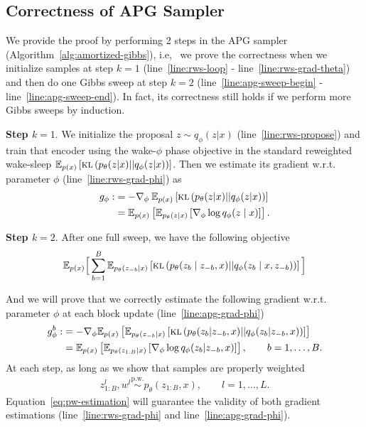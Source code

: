 \documentclass{article}
\theoremstyle{definition}
\newcommand{\given}{\lvert}
\newcommand{\pw}{\overset{\text{p.w.}}{\sim}
}
\begin{document}
\subsection{Correctness of APG Sampler}
We provide the proof by performing 2 steps in the APG sampler (Algorithm~\ref{alg:amortized-gibbs}), i.e,~ we prove the correctness when we initialize samples at step $k=1$ (line~\ref{line:rws-loop} - line~\ref{line:rws-grad-theta}) and then do one Gibbs sweep at step $k=2$ (line~\ref{line:apg-sweep-begin} - line~\ref{line:apg-sweep-end}). In fact, its correctness still holds if we perform more Gibbs sweeps by induction.

\textbf{Step $k=1$}. We initialize the proposal $z\sim q_\phi(z \given x)$ (line~\ref{line:rws-propose}) and train that encoder using the wake-$\phi$ phase objective in the standard reweighted wake-sleep\cite{le2019revisiting}
$\E_{p(x)}\left[\textsc{kl}\left(p_\theta(z \given x) || q_\phi(z \given x)\right)\right]$. 
Then we estimate its gradient w.r.t. parameter $\phi$ (line~\ref{line:rws-grad-phi}) as
\begin{align}
    \label{eq:g-rws-phi}
    g_\phi :&= - \nabla_\phi \: \E_{p(x)}\left[\textsc{kl}\left(p_\theta(z \given x) || q_\phi(z \given x)\right)\right] \\
    &
    =
    \E_{p(x)}\left[
    \E_{p_\theta(z \given x)}\left[\nabla_\phi \log q_\phi(z \mid x)\right]
    \right]
    . 
\end{align}

\textbf{Step $k=2$}. After one full sweep, we have the following objective
\begin{align*}
    \mathbb{E}_{p(x)}\Big[
    \sum_{b = 1}^B\mathbb{E}_{p_\theta(z_{-b} \mid x)}\left[\textsc{kl}\left(p_\theta(z_b \mid z_{-b}, x) || q_\phi(z_b \mid x, z_{-b})\right)\right]\Big] 
\end{align*}

And we will prove that we correctly estimate the following gradient w.r.t. parameter $\phi$ at each block update (line~\ref{line:apg-grad-phi}) 
\begin{align}
    g_\phi^b 
    :&= - \nabla_\phi \E_{p(x)}\left[ \E_{p_\theta(z_{-b} \given x)}\left[\textsc{kl}\left(p_\theta(z_b \given z_{-b}, x) || q_\phi(z_b \given z_{-b}, x)\right)\right]
    \right]
    \\
    &= 
    \E_{p(x)}\left[
    \E_{p_\theta(z_{1:B} \given x)}\left[\nabla_\phi \log q_\phi(z_b \given z_{-b}, x)\right]
    \right], \qquad b = 1, \ldots, B
    . \label{eq:g-phi-b}
\end{align}
At each step, as long as we show that samples are properly weighted
\begin{align}
    z_{1:B}^l, w^l \pw p_\theta(z_{1:B}, x), \qquad l = 1, \ldots, L.
    \label{eq:invariant}
\end{align}
Equation~\ref{eq:pw-estimation} will guarantee the validity of both gradient estimations (line~\ref{line:rws-grad-phi} and line~\ref{line:apg-grad-phi}).
\end{document}
